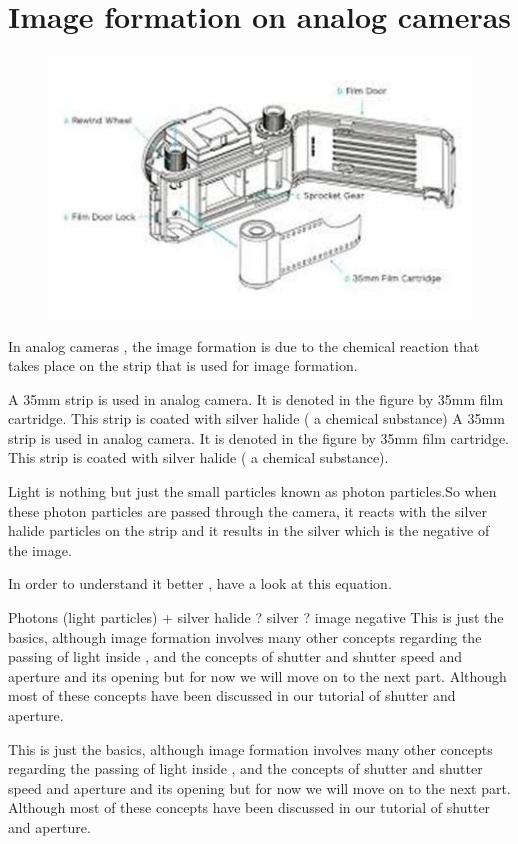 \documentclass[a4paper]{article}
\begin{document}
  \section{Image formation on analog cameras}
   \begin{figure}[h]
   \centering
   \includegraphics{aa}
   \end{figure}
   In analog cameras , the image formation is due to the chemical reaction that takes place on the strip that is used for image formation.

A 35mm strip is used in analog camera. It is denoted in the figure by 35mm film cartridge. This strip is coated with silver halide ( a chemical substance)
A 35mm strip is used in analog camera. It is denoted in the figure by 35mm film cartridge. This strip is coated with silver halide ( a chemical substance).

Light is nothing but just the small particles known as photon particles.So when these photon particles are passed through the camera, it reacts with the silver halide particles on the strip and it results in the silver which is the negative of the image.

In order to understand it better , have a look at this equation.

Photons (light particles) + silver halide ? silver ? image negative
This is just the basics, although image formation involves many other concepts regarding the passing of light inside , and the concepts of shutter and shutter speed and aperture and its opening but for now we will move on to the next part. Although most of these concepts have been discussed in our tutorial of shutter and aperture.

This is just the basics, although image formation involves many other concepts regarding the passing of light inside , and the concepts of shutter and shutter speed and aperture and its opening but for now we will move on to the next part. Although most of these concepts have been discussed in our tutorial of shutter and aperture.
\end{document}
